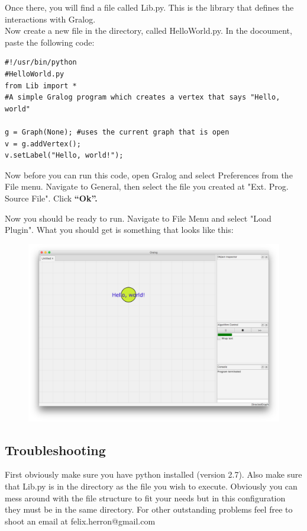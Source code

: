 \documentclass{article}
\begin{document}
Once there, you will find a file called Lib.py. This is the library that defines the interactions with Gralog.\\

Now create a new file in the directory, called HelloWorld.py. In the docoument, paste the following code: 

\begin{lstlisting}
#!/usr/bin/python
#HelloWorld.py
from Lib import *
#A simple Gralog program which creates a vertex that says "Hello, world"

g = Graph(None); #uses the current graph that is open
v = g.addVertex();
v.setLabel("Hello, world!");
\end{lstlisting}

Now before you can run this code, open Gralog and select Preferences from the File menu. Navigate to General, then select the file you created at "Ext. Prog. Source File". Click \textbf{``Ok''.}

Now you should be ready to run. Navigate to File Menu and select "Load Plugin". What you should get is something that looks like this: 

\begin{figure}[H]
\centering
\includegraphics[width=\textwidth]{helloWorld.png}
\end{figure}

\subsection{Troubleshooting}
First obviously make sure you have python installed (version 2.7). Also make sure that Lib.py is in the directory as the file you wish to execute. Obviously you can mess around with the file structure to fit your needs but in this configuration they must be in the same directory. For other outstanding problems feel free to shoot an email at felix.herron@gmail.com 
\end{document}
